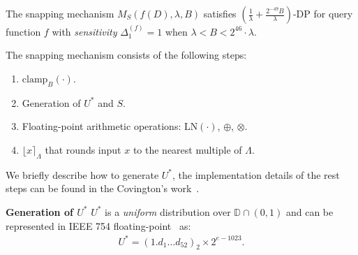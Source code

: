 \begin{theorem}
    The snapping mechanism $M_{S}\left(f\left(D\right),\lambda,B\right)$ satisfies $\left(\frac{1}{\lambda}+\frac{2^{-49}B}{\lambda}\right) $-DP for query function $f$ with \textit{sensitivity} $\Delta _1^{\left(f\right) } =1$ when $\lambda<B<2^{46}\cdot\lambda$.
\end{theorem}



The snapping mechanism consists of the following steps:
\begin{enumerate}
    \label{enu:snappingSteps}
    \item $\text{clamp}_B\left(\cdot\right) $.
    \item Generation of $U^{*}$ and $S$.
    \item Floating-point arithmetic operations: $\text{LN}\left(\cdot\right) $, $\oplus$, $\otimes $.
    \item $\lfloor x\rceil_{\Lambda}$ that rounds input $x$ to the nearest multiple of $\Lambda $.
\end{enumerate}
We briefly describe how to generate $U^{*}$, the implementation details of the rest steps can be found in the Covington's work~\cite{Covington2019}.



\textbf{Generation of $U^{*}$}
$U^{*}$ is a \textit{uniform} distribution over $\mathbb{D} \cap \left(0,1\right) $ and can be represented in IEEE 754 floating-point~\cite{IEEE754_2019} as:
\begin{equation}
    \begin{split}
        U^{*}=\left(1.d_{1}\ldots d_{52}\right)_{2}\times2^{e-1023}.
    \end{split}
\end{equation}

